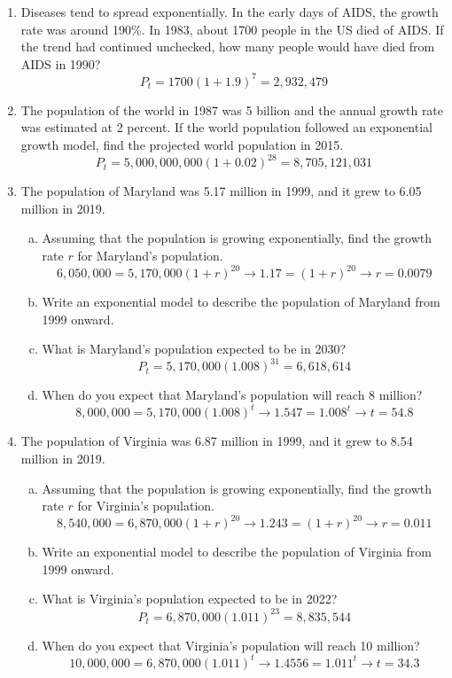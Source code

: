 \begin{enumerate}
\item Diseases tend to spread exponentially.  In the early days of AIDS, the growth rate was around 190\%.  In 1983, about 1700 people in the US died of AIDS.  If the trend had continued unchecked, how many people would have died from AIDS in 1990? 
\[P_t = 1700(1 + 1.9)^{7} = 2,932,479\]

\item The population of the world in 1987 was 5 billion and the annual growth rate was estimated at 2 percent.  If the world population followed an exponential growth model, find the projected world population in 2015. 
\[P_t = 5,000,000,000(1 + 0.02)^{28} = 8,705,121,031\]

\item The population of Maryland was 5.17 million in 1999, and it grew to 6.05 million in 2019.
\begin{enumerate}[(a)]
\item Assuming that the population is growing exponentially, find the growth rate $r$ for Maryland's population. 
\[6,050,000 = 5,170,000(1 + r)^{20} \longrightarrow 1.17 = (1 + r)^{20} \longrightarrow r = 0.0079\]
\item Write an exponential model to describe the population of Maryland from 1999 onward. 
\item What is Maryland's population expected to be in 2030? 
\[P_t = 5,170,000(1.008)^{31} = 6,618,614\]
\item When do you expect that Maryland's population will reach 8 million? 
\[8,000,000 = 5,170,000(1.008)^t \longrightarrow 1.547 = 1.008^t \longrightarrow t = 54.8\]
\end{enumerate}

\item The population of Virginia was 6.87 million in 1999, and it grew to 8.54 million in 2019.
\begin{enumerate}[(a)]
\item Assuming that the population is growing exponentially, find the growth rate $r$ for Virginia's population. 
\[8,540,000 = 6,870,000(1 + r)^{20} \longrightarrow 1.243 = (1 + r)^{20} \longrightarrow r = 0.011\]
\item Write an exponential model to describe the population of Virginia from 1999 onward. 
\item What is Virginia's population expected to be in 2022? 
\[P_t = 6,870,000(1.011)^{23} = 8,835,544\]
\item When do you expect that Virginia's population will reach 10 million? 
\[10,000,000 = 6,870,000(1.011)^t \longrightarrow 1.4556 = 1.011^t \longrightarrow t = 34.3\]
\end{enumerate}
\pagebreak


\end{enumerate}
